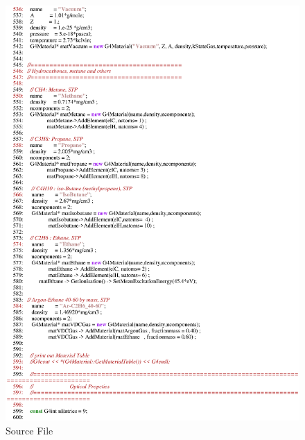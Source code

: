 \begin{figure}[h]
  \hspace{0cm}
  \includegraphics[scale=0.8]{./figures17/QweakSimMaterial.cc-p9.eps}
  \caption{\label{SourceXVII10} Source File}
           \label{fig:XVII-SC-10}
\end{figure}
\clearpage

